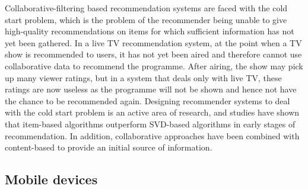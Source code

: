 	Collaborative-filtering based recommendation systems are faced with the cold start problem, which is the problem of the recommender being unable to give high-quality recommendations on items for which sufficient information has not yet been gathered. In a live TV recommendation system, at the point when a TV show is recommended to users, it has not yet been aired and therefore cannot use collaborative data to recommend the programme. After airing, the show may pick up many viewer ratings, but in a system that deals only with live TV, these ratings are now useless as the programme will not be shown and hence not have the chance to be recommended again. Designing recommender systems to deal with the cold start problem is an active area of research, and studies have shown that item-based algorithms outperform SVD-based algorithms in early stages of recommendation\cite{cold-start-problem}. In addition, collaborative approaches have been combined with content-based to provide an initial source of information\cite{generative_models}.

	\subsection{Mobile devices}
